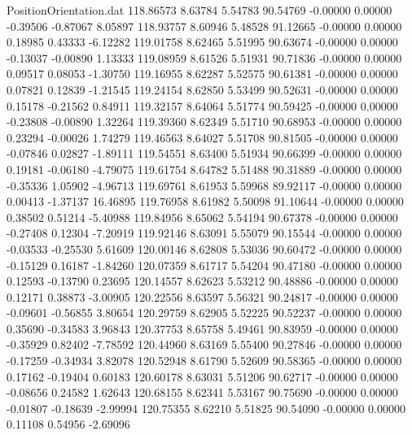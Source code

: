 \begin{filecontents}{PositionOrientation.dat}
 118.86573    8.63784    5.54783    90.54769   -0.00000    0.00000   -0.39506   -0.87067    8.05897
 118.93757    8.60946    5.48528    91.12665   -0.00000    0.00000    0.18985    0.43333   -6.12282
 119.01758    8.62465    5.51995    90.63674   -0.00000    0.00000   -0.13037   -0.00890    1.13333
 119.08959    8.61526    5.51931    90.71836   -0.00000    0.00000    0.09517    0.08053   -1.30750
 119.16955    8.62287    5.52575    90.61381   -0.00000    0.00000    0.07821    0.12839   -1.21545
 119.24154    8.62850    5.53499    90.52631   -0.00000    0.00000    0.15178   -0.21562    0.84911
 119.32157    8.64064    5.51774    90.59425   -0.00000    0.00000   -0.23808   -0.00890    1.32264
 119.39360    8.62349    5.51710    90.68953   -0.00000    0.00000    0.23294   -0.00026    1.74279
 119.46563    8.64027    5.51708    90.81505   -0.00000    0.00000   -0.07846    0.02827   -1.89111
 119.54551    8.63400    5.51934    90.66399   -0.00000    0.00000    0.19181   -0.06180   -4.79075
 119.61754    8.64782    5.51488    90.31889   -0.00000    0.00000   -0.35336    1.05902   -4.96713
 119.69761    8.61953    5.59968    89.92117   -0.00000    0.00000    0.00413   -1.37137   16.46895
 119.76958    8.61982    5.50098    91.10644   -0.00000    0.00000    0.38502    0.51214   -5.40988
 119.84956    8.65062    5.54194    90.67378   -0.00000    0.00000   -0.27408    0.12304   -7.20919
 119.92146    8.63091    5.55079    90.15544   -0.00000    0.00000   -0.03533   -0.25530    5.61609
 120.00146    8.62808    5.53036    90.60472   -0.00000    0.00000   -0.15129    0.16187   -1.84260
 120.07359    8.61717    5.54204    90.47180   -0.00000    0.00000    0.12593   -0.13790    0.23695
 120.14557    8.62623    5.53212    90.48886   -0.00000    0.00000    0.12171    0.38873   -3.00905
 120.22556    8.63597    5.56321    90.24817   -0.00000    0.00000   -0.09601   -0.56855    3.80654
 120.29759    8.62905    5.52225    90.52237   -0.00000    0.00000    0.35690   -0.34583    3.96843
 120.37753    8.65758    5.49461    90.83959   -0.00000    0.00000   -0.35929    0.82402   -7.78592
 120.44960    8.63169    5.55400    90.27846   -0.00000    0.00000   -0.17259   -0.34934    3.82078
 120.52948    8.61790    5.52609    90.58365   -0.00000    0.00000    0.17162   -0.19404    0.60183
 120.60178    8.63031    5.51206    90.62717   -0.00000    0.00000   -0.08656    0.24582    1.62643
 120.68155    8.62341    5.53167    90.75690   -0.00000    0.00000   -0.01807   -0.18639   -2.99994
 120.75355    8.62210    5.51825    90.54090   -0.00000    0.00000    0.11108    0.54956   -2.69096

\end{filecontents}
